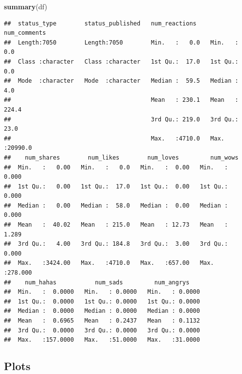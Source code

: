 \documentclass[
]{article}
\newenvironment{Shaded}{\begin{snugshade}}{\end{snugshade}}
\newcommand{\FunctionTok}[1]{\textcolor[rgb]{0.13,0.29,0.53}{\textbf{#1}}}
\newcommand{\NormalTok}[1]{#1}
\begin{document}
\begin{Shaded}
\begin{Highlighting}[]
\FunctionTok{summary}\NormalTok{(df)}
\end{Highlighting}
\end{Shaded}

\begin{verbatim}
##  status_type        status_published   num_reactions     num_comments    
##  Length:7050        Length:7050        Min.   :   0.0   Min.   :    0.0  
##  Class :character   Class :character   1st Qu.:  17.0   1st Qu.:    0.0  
##  Mode  :character   Mode  :character   Median :  59.5   Median :    4.0  
##                                        Mean   : 230.1   Mean   :  224.4  
##                                        3rd Qu.: 219.0   3rd Qu.:   23.0  
##                                        Max.   :4710.0   Max.   :20990.0  
##    num_shares        num_likes        num_loves         num_wows      
##  Min.   :   0.00   Min.   :   0.0   Min.   :  0.00   Min.   :  0.000  
##  1st Qu.:   0.00   1st Qu.:  17.0   1st Qu.:  0.00   1st Qu.:  0.000  
##  Median :   0.00   Median :  58.0   Median :  0.00   Median :  0.000  
##  Mean   :  40.02   Mean   : 215.0   Mean   : 12.73   Mean   :  1.289  
##  3rd Qu.:   4.00   3rd Qu.: 184.8   3rd Qu.:  3.00   3rd Qu.:  0.000  
##  Max.   :3424.00   Max.   :4710.0   Max.   :657.00   Max.   :278.000  
##    num_hahas           num_sads         num_angrys     
##  Min.   :  0.0000   Min.   : 0.0000   Min.   : 0.0000  
##  1st Qu.:  0.0000   1st Qu.: 0.0000   1st Qu.: 0.0000  
##  Median :  0.0000   Median : 0.0000   Median : 0.0000  
##  Mean   :  0.6965   Mean   : 0.2437   Mean   : 0.1132  
##  3rd Qu.:  0.0000   3rd Qu.: 0.0000   3rd Qu.: 0.0000  
##  Max.   :157.0000   Max.   :51.0000   Max.   :31.0000
\end{verbatim}

\subsection{Plots}\label{plots}
\end{document}
